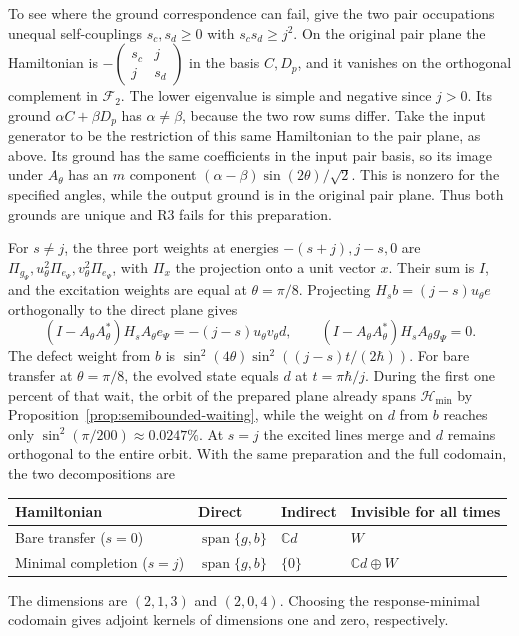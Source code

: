 \documentclass[11pt]{article}
\theoremstyle{definition}
\DeclareMathOperator{\Span}{span}
\newcommand{\C}{\mathbb C}
\newcommand{\Hmin}{\mathcal H_{\min}}
\begin{document}
To see where the ground correspondence can fail, give the two pair occupations unequal self-couplings $s_c,s_d\geq0$ with $s_cs_d\geq j^2$. On the original pair plane the Hamiltonian is $-\left(\begin{smallmatrix}s_c&j\\j&s_d\end{smallmatrix}\right)$ in the basis $C,D_p$, and it vanishes on the orthogonal complement in $\mathcal F_2$. The lower eigenvalue is simple and negative since $j>0$. Its ground $\alpha C+\beta D_p$ has $\alpha\ne\beta$, because the two row sums differ. Take the input generator to be the restriction of this same Hamiltonian to the pair plane, as above. Its ground has the same coefficients in the input pair basis, so its image under $A_\theta$ has an $m$ component $(\alpha-\beta)\sin(2\theta)/\sqrt2$. This is nonzero for the specified angles, while the output ground is in the original pair plane. Thus both grounds are unique and R3 fails for this preparation.

For $s\ne j$, the three port weights at energies $-(s+j), j-s,0$ are $\Pi_{g_\Psi},u_\theta^2\Pi_{e_\Psi},v_\theta^2\Pi_{e_\Psi}$, with $\Pi_x$ the projection onto a unit vector $x$. Their sum is $I$, and the excitation weights are equal at $\theta=\pi/8$. Projecting $H_sb=(j-s)u_\theta e$ orthogonally to the direct plane gives
\begin{equation}
 (I-A_\theta A_\theta^*)H_sA_\theta e_\Psi=-(j-s)u_\theta v_\theta d,\qquad
 (I-A_\theta A_\theta^*)H_sA_\theta g_\Psi=0 .
 \label{eq:pair-invariance-amplitude}
\end{equation}
The defect weight from $b$ is $\sin^2(4\theta)\sin^2((j-s)t/(2\hbar))$. For bare transfer at $\theta=\pi/8$, the evolved state equals $d$ at $t=\pi\hbar/j$. During the first one percent of that wait, the orbit of the prepared plane already spans $\Hmin$ by Proposition~\ref{prop:semibounded-waiting}, while the weight on $d$ from $b$ reaches only $\sin^2(\pi/200)\approx 0.0247\%$. At $s=j$ the excited lines merge and $d$ remains orthogonal to the entire orbit. With the same preparation and the full codomain, the two decompositions are
\begin{center}
\begin{tabular}{@{}llll@{}}\toprule
Hamiltonian & Direct & Indirect & Invisible for all times\\\midrule
Bare transfer ($s=0$) & $\Span\{g,b\}$ & $\C d$ & $W$\\
Minimal completion ($s=j$) & $\Span\{g,b\}$ & $\{0\}$ & $\C d\oplus W$\\\bottomrule
\end{tabular}
\end{center}
The dimensions are $(2,1,3)$ and $(2,0,4)$. Choosing the response-minimal codomain gives adjoint kernels of dimensions one and zero, respectively.
\end{document}
